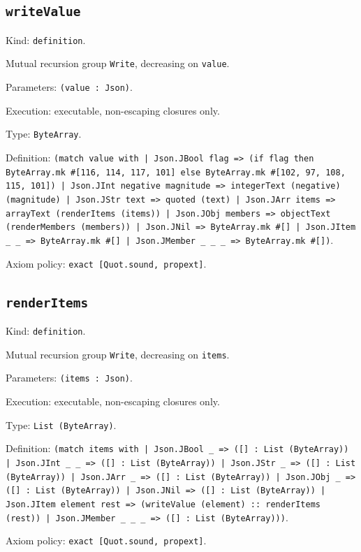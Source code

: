 \documentclass[11pt]{article}
\begin{document}
\subsection*{\texttt{writeValue}}
\noindent Kind: \texttt{definition}.\par
\noindent Mutual recursion group \texttt{Write}, decreasing on \texttt{value}.\par
\noindent Parameters: \texttt{(value : Json)}.\par
\noindent Execution: executable, non-escaping closures only.\par
\noindent Type: \texttt{ByteArray}.\par
\noindent Definition: \texttt{(match value with | Json.JBool flag => (if flag then ByteArray.mk \#[116, 114, 117, 101] else ByteArray.mk \#[102, 97, 108, 115, 101]) | Json.JInt negative magnitude => integerText (negative) (magnitude) | Json.JStr text => quoted (text) | Json.JArr items => arrayText (renderItems (items)) | Json.JObj members => objectText (renderMembers (members)) | Json.JNil => ByteArray.mk \#[] | Json.JItem \_ \_ => ByteArray.mk \#[] | Json.JMember \_ \_ \_ => ByteArray.mk \#[])}.\par
\noindent Axiom policy: \texttt{exact [Quot.sound, propext]}.\par
\subsection*{\texttt{renderItems}}
\noindent Kind: \texttt{definition}.\par
\noindent Mutual recursion group \texttt{Write}, decreasing on \texttt{items}.\par
\noindent Parameters: \texttt{(items : Json)}.\par
\noindent Execution: executable, non-escaping closures only.\par
\noindent Type: \texttt{List (ByteArray)}.\par
\noindent Definition: \texttt{(match items with | Json.JBool \_ => ([] : List (ByteArray)) | Json.JInt \_ \_ => ([] : List (ByteArray)) | Json.JStr \_ => ([] : List (ByteArray)) | Json.JArr \_ => ([] : List (ByteArray)) | Json.JObj \_ => ([] : List (ByteArray)) | Json.JNil => ([] : List (ByteArray)) | Json.JItem element rest => (writeValue (element) :: renderItems (rest)) | Json.JMember \_ \_ \_ => ([] : List (ByteArray)))}.\par
\noindent Axiom policy: \texttt{exact [Quot.sound, propext]}.\par
\end{document}
